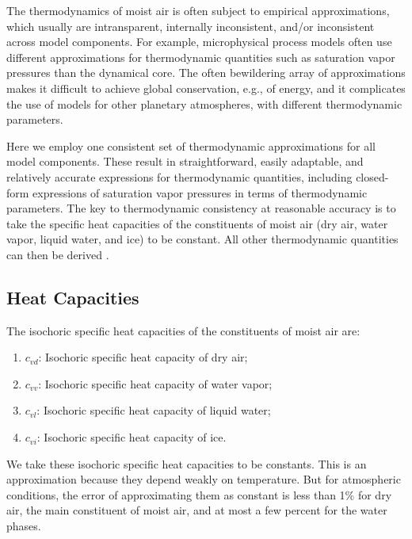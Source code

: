 \documentclass{article}
\begin{document}
The thermodynamics of moist air is often subject to empirical approximations, which usually are intransparent, internally inconsistent, and/or inconsistent across model components. For example, microphysical process models often use different approximations for thermodynamic quantities such as saturation vapor pressures than the dynamical core. The often bewildering array of approximations makes it difficult to achieve global conservation, e.g., of energy, and it complicates the use of models for other planetary atmospheres, with different thermodynamic parameters. 

Here we employ one consistent set of thermodynamic approximations for all model components. These result in straightforward, easily adaptable, and relatively accurate expressions for thermodynamic quantities, including closed-form expressions of saturation vapor pressures in terms of thermodynamic parameters. The key to thermodynamic consistency at reasonable accuracy is to take the specific heat capacities of the constituents of moist air (dry air, water vapor, liquid water, and ice) to be constant. All other thermodynamic quantities can then be derived \citep[cf.][]{Romps08a}. 

\subsection{Heat Capacities}\label{s:heat_capacities}

The isochoric specific heat capacities of the constituents of moist air are:
\begin{enumerate}
    \item $c_{vd}$: Isochoric specific heat capacity of dry air;
    \item $c_{vv}$: Isochoric specific heat capacity of water vapor;
    \item $c_{vl}$: Isochoric specific heat capacity of liquid water;
    \item $c_{vi}$: Isochoric specific heat capacity of ice.
\end{enumerate}
We take these isochoric specific heat capacities to be constants. This is an approximation because they depend weakly on temperature. But for atmospheric conditions, the error of approximating them as constant is less than 1\% for dry air, the main constituent of moist air, and at most a few percent for the water phases.
\end{document}

